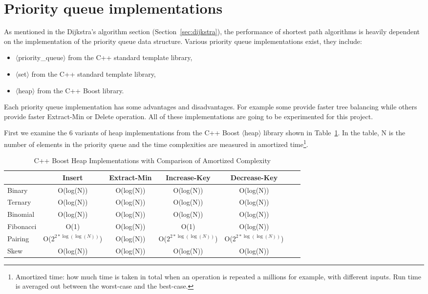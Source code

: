 \section{Priority queue implementations} \label{sec:pq_implementation}
As mentioned in the Dijkstra's algorithm section (Section~\ref{sec:dijkstra}),
the performance of shortest path algorithms is heavily dependent on the implementation of the priority queue data structure.
Various priority queue implementations exist,
they include:
\begin{itemize}
    \item $\langle$priority\_queue$\rangle$ from the C++ standard template library,
    \item $\langle$set$\rangle$ from the C++ standard template library,
    \item $\langle$heap$\rangle$ from the C++ Boost library.
\end{itemize}
Each priority queue implementation has some advantages and disadvantages.
For example some provide faster tree balancing while others provide faster Extract-Min or Delete operation.
All of these implementations are going to be experimented for this project.

First we examine the 6 variants of heap implementations from the C++ Boost $\langle$heap$\rangle$ library shown in Table~\ref{table:heaps}.
In the table, N is the number of elements in the priority queue and
the time complexities are measured in amortized time\footnote{
Amortized time: how much time is taken in total when an operation is repeated a millions for example, with different inputs. Run time is averaged out between the worst-case and the best-case.}.

\begin{table}[H]
    \centering
    \begin{tabular*}{\textwidth}{@{\extracolsep{\fill}} l|cccccc}
                        & Insert    & Extract-Min      & Increase-Key & Decrease-Key \\ \midrule
        Binary          & O(log(N)) & O(log(N)) & O(log(N))  & O(log(N))  \\
        Ternary         & O(log(N)) & O(log(N)) & O(log(N))  & O(log(N))  \\
        Binomial        & O(log(N)) & O(log(N)) & O(log(N))  & O(log(N))  \\
        Fibonacci       & O(1)      & O(log(N)) & O(1)       & O(log(N))  \\
        Pairing         & O($2^{2*\log(\log(N))}$) & O(log(N)) & O($2^{2*\log(\log(N))}$) & O($2^{2*\log(\log(N))}$) \\
        Skew            & O(log(N)) & O(log(N)) & O(log(N)) & O(log(N))   
    \end{tabular*}
    \caption{C++ Boost Heap Implementations with Comparison of Amortized Complexity \citep{BoostHeap}}
    \label{table:heaps}
\end{table}

